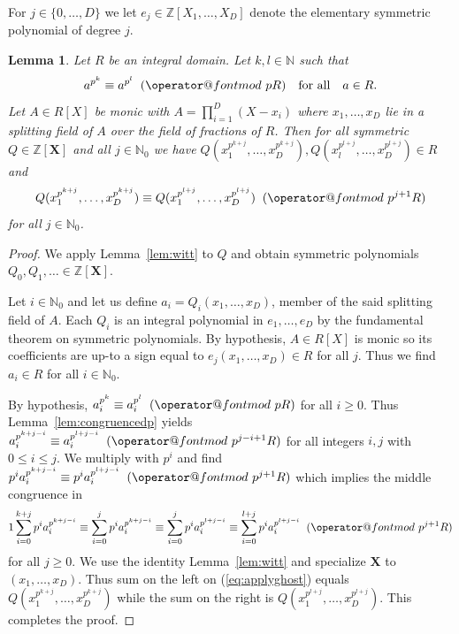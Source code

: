 \documentclass[12pt,oneside,a4]{amsart}
\makeatletter
\newcommand{\IN}{\mathbb{N}}
\newcommand{\IZ}{\mathbb{Z}}
\newcounter{maincounter}
\numberwithin{maincounter}{section}
\numberwithin{equation}{section}
\newtheorem{lemma}[maincounter]{Lemma}
\def\imod#1{\allowbreak\mkern10mu({\operator@font mod}\,\,#1)}
\makeatother
\begin{document}
For  $j\in \{0,\ldots,D\}$ we let
$e_j\in\IZ[X_1,\ldots,X_D]$
denote the elementary symmetric polynomial of degree $j$. 

\begin{lemma}
  \label{lem:ppowermodulp}
  Let $R$ be an integral domain.
  Let $k,l\in\IN$ such that
  \begin{equation}
    \label{eq:apkapl}
    a^{p^{k}}\equiv a^{p^{l}} \imod {pR} \quad\text{for all}\quad
    a\in R.
  \end{equation}
  Let $A\in R[X]$ be monic with $A = \prod_{i=1}^D (X-x_i)$
  where $x_1,\ldots,x_D$ lie in a splitting field of $A$ over the field of
  fractions of $R$.
  Then for all symmetric  $Q\in\IZ[{\boldsymbol X}]$ and all $j\in\IN_0$ we
  have 
  $    Q(x_1^{p^{k+j}},\ldots,x_D^{p^{k+j}}),
  Q(x_l^{p^{l+j}},\ldots,x_D^{p^{l+j}})\in R$ and 
  \begin{equation*}
    Q(x_1^{p^{k+j}},\ldots,x_D^{p^{k+j}}) \equiv
    Q(x_1^{p^{l+j}},\ldots,x_D^{p^{l+j}}) \imod{p^{j+1}R}
  \end{equation*}
  for all $j\in\IN_0$. 
\end{lemma}
\begin{proof}
  We apply Lemma~\ref{lem:witt} to $Q$ and obtain symmetric polynomials
  $Q_0,Q_1,\ldots \in \IZ[{\boldsymbol X}]$.

  Let $i\in \IN_0$ and let
  us define $a_i = Q_i(x_1,\ldots,x_D)$, member of the said
  splitting field of $A$. 
  Each $Q_i$ is an integral polynomial in $e_1,\ldots,e_D$ by the fundamental
  theorem on symmetric polynomials.
  By hypothesis, $A\in R[X]$ is monic so its coefficients are up-to a
  sign equal to 
  $e_j(x_1,\ldots,x_D)\in R$ for all $j$.  Thus we find
  $a_i\in R$ for all $i\in\IN_0$.

  By hypothesis, $a_i^{p^{k}} \equiv a_i^{p^{l}} \imod
  {p R}$ for all $i\ge 0$. Thus Lemma~\ref{lem:congruencedp} yields
  $a_i^{p^{k+j-i}} \equiv a_i^{p^{l+j-i}} \imod
  {p^{j-i+1} R}$ for all integers $i,j$ with $0\le i\le j$.
  We multiply with
  $p^{i}$ and find
  $p^{i} a_i^{p^{k+j-i}} \equiv p^{i} a_i^{p^{l+j-i}} \imod
  {p^{j+1}R}$ which implies  the middle congruence in
  \begin{alignat}1
    \label{eq:applyghost}
  \sum_{i=0}^{k+j} p^i     a_i^{p^{k+j-i}}
    \equiv \sum_{i=0}^j p^i a_i^{p^{k+j-i}} 
    \equiv \sum_{i=0}^j p^i a_i^{p^{l+j-i}} 
    \equiv \sum_{i=0}^{l+j} p^i a_i^{p^{l+j-i}} \imod{p^{j+1}R}
  \end{alignat}
  for all  $j\ge 0$. 
  We use the identity  Lemma~\ref{lem:witt} and specialize
  ${\boldsymbol X}$ to $(x_1,\ldots,x_D)$. Thus sum on the left on
  (\ref{eq:applyghost}) equals
  $Q(x_1^{p^{k+j}},\ldots,x_D^{p^{k+j}})$ while the sum
  on the right is
  $Q(x_1^{p^{l+j}},\ldots,x_D^{p^{l+j}})$. This completes the
  proof. 
\end{proof}
\end{document}
